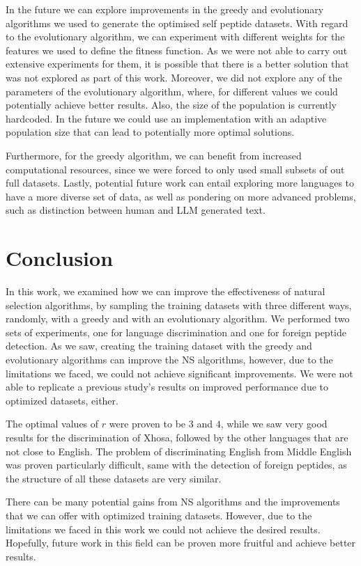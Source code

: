 \documentclass{article}
\begin{document}
In the future we can explore improvements in the greedy and evolutionary algorithms we used to generate the optimised 
self peptide datasets. With regard to the evolutionary algorithm, we can experiment with different weights for the
features we used to define the fitness function. As we were not able to carry out extensive experiments for them, it is 
possible that there is a better solution that was not explored as part of this work. Moreover, we did not explore any
of the parameters of the evolutionary algorithm, where, for different values we could potentially achieve better
results. Also, the size of the population is currently hardcoded. In the future we could use an implementation with an
adaptive population size that can lead to potentially more optimal solutions.

Furthermore, for the greedy algorithm, we can benefit from increased computational resources, since we were 
forced to only used small subsets of out full datasets. Lastly, potential future work can entail exploring more languages to have a more diverse set of data, as well as pondering 
on more advanced problems, such as distinction between human and LLM generated text.

\section{Conclusion}
In this work, we examined how we can improve the effectiveness of natural selection algorithms, by sampling the training
datasets with three different ways, randomly, with a greedy and with an evolutionary algorithm. We performed two sets of
experiments, one for language discrimination and one for foreign peptide detection. As we saw, creating the training
dataset with the greedy and evolutionary algorithms can improve the NS algorithms, however, due to the limitations we
faced, we could not achieve significant improvements. We were not able to replicate a previous study's results on improved performance due to optimized datasets, either.

The optimal values of $r$ were proven to be $3$ and $4$, while we saw very good results for the discrimination of Xhosa,
followed by the other languages that are not close to English. The problem of discriminating English from Middle English
was proven particularly difficult, same with the detection of foreign peptides, as the structure of all these datasets
are very similar.

There can be many potential gains from NS algorithms and the improvements that we can offer with optimized training
datasets. However, due to the limitations we faced in this work we could not achieve the desired results. Hopefully, 
future work in this field can be proven more fruitful and achieve better results.
\end{document}
